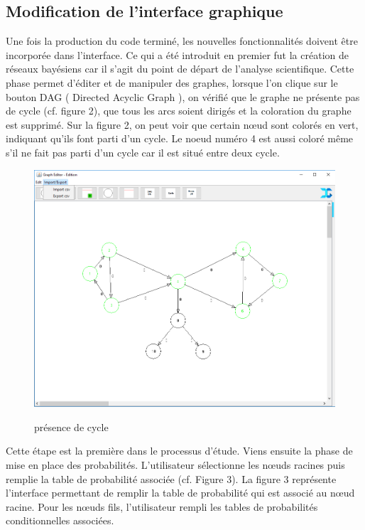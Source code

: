 \documentclass[conference]{IEEEtran}
\begin{document}
\subsection{Modification de l'interface graphique }

Une fois la production du code terminé, les nouvelles fonctionnalités doivent être incorporée dans l'interface. Ce qui a été introduit en premier fut la création de réseaux bayésiens car il s'agit du point de départ de l'analyse scientifique. Cette phase permet d'éditer et de manipuler des graphes, lorsque l'on clique sur le bouton DAG ( Directed Acyclic Graph ), on vérifié que le graphe ne présente pas de cycle (cf. figure 2), que tous les arcs soient dirigés et la coloration du graphe est supprimé. Sur la figure 2, on peut voir que certain nœud sont colorés en vert, indiquant qu'ils font parti d'un cycle. Le noeud numéro 4 est aussi coloré même s'il ne fait pas parti d'un cycle car il est situé entre deux cycle. 
\begin{figure}[!h]
\includegraphics[scale=0.3]{Cycle.png}
\label{fig 2}
\caption{présence de cycle}
\end{figure}



Cette étape est la première dans le processus d'étude. Viens ensuite la phase de mise en place des probabilités. L'utilisateur sélectionne les nœuds racines puis remplie la table de probabilité associée (cf. Figure 3). La figure 3 représente l'interface permettant de remplir la table de probabilité qui est associé au nœud racine.  
Pour les nœuds fils, l'utilisateur rempli les tables de probabilités conditionnelles associées. 
\end{document}
